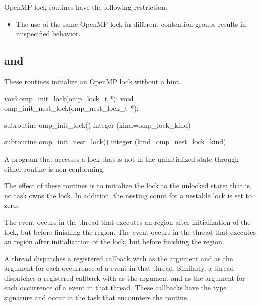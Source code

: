 \restrictions
OpenMP lock routines have the following restriction:

\begin{itemize}
\item The use of the same OpenMP lock in different contention groups 
      results in unspecified behavior.
\end{itemize}



\subsection{ and }
\label{subsec:omp_init_lock and omp_init_nest_lock}
\summary
These routines initialize an OpenMP lock without a hint.

\format
\begin{ccppspecific}
\begin{ompcFunction}
void omp_init_lock(omp_lock_t *);
void omp_init_nest_lock(omp_nest_lock_t *);
\end{ompcFunction}
\end{ccppspecific}

\begin{fortranspecific}
\begin{ompfSubroutine}
subroutine omp_init_lock()
integer (kind=omp_lock_kind) 

subroutine omp_init_nest_lock()
integer (kind=omp_nest_lock_kind) 
\end{ompfSubroutine}
\end{fortranspecific}

\constraints
A program that accesses a lock that is not in the uninitialized state 
through either routine is non-conforming.

\effect
The effect of these routines is to initialize the lock to the unlocked 
state; that is, no task owns the lock. In addition, the nesting count 
for a nestable lock is set to zero.

\events
The  event occurs in the thread that executes an 
 region after initialization of the lock, but 
before finishing the region. The  event occurs 
in the thread that executes an  region
after initialization of the lock, but before finishing the region.

\tools
A thread dispatches a registered  
callback with  as the  argument 
and  as the  argument for each 
occurrence of a  event in that thread. Similarly, 
a thread dispatches a registered  
callback with  as the  argument 
and  as the  argument for each 
occurrence of a  event in that thread. These 
callbacks have the type signature 
and occur in the task that encounters the routine.

